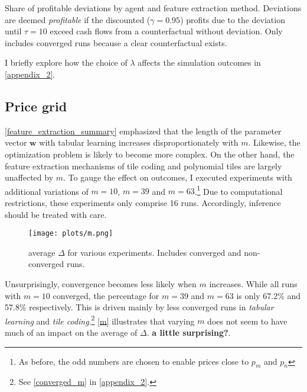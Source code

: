 \begin{center}
	\begin{table}
		
		\caption{Share of profitable deviations by agent and feature extraction method. Deviations are deemed \emph{profitable} if the discounted ($\gamma = 0.95$) profits due to the deviation until $\tau = 10$  exceed cash flows from a counterfactual without deviation. Only includes converged runs because a clear counterfactual exists.}
		\label{share_deviation_profitability_beta}
	\end{table}
\end{center}

I briefly explore how the choice of $\lambda$ affects the simulation outcomes in \autoref{appendix_2}.

\subsection{Price grid}

\autoref{feature_extraction_summary} emphasized that the length of the parameter vector $\boldsymbol{w}$ with tabular learning increases disproportionately with $m$. Likewise, the optimization problem is likely to become more complex. On the other hand, the feature extraction mechanisms of tile coding and polynomial tiles are largely unaffected by $m$. To gauge the effect on outcomes, I executed experiments with additional variations of $m=10$, $m = 39$ and $m = 63$.\footnote{As before, the odd numbers are chosen to enable prices close to $p_m$ and $p_n$} Due to computational restrictions, these experiments  only comprise 16 runs. Accordingly, inference should be treated with care.

\begin{figure}
	\texttt{[image: plots/m.png]}
	\caption{average $\Delta$ for various experiments. Includes converged and non-converged runs.}
	\label{m}
\end{figure}

Unsurprisingly, convergence becomes less likely when $m$ increases. While all runs with $m=10$ converged, the percentage for $m=39$ and $m=63$ is only  67.2\% and 57.8\% respectively. This is driven mainly by less converged runs in \emph{tabular learning} and \emph{tile coding}.\footnote{See \autoref{converged_m} in \autoref{appendix_2}.} \autoref{m} illustrates that varying $m$ does not seem to have much of an impact on the average of $\Delta$. 
\textbf{a little surprising?}. 

